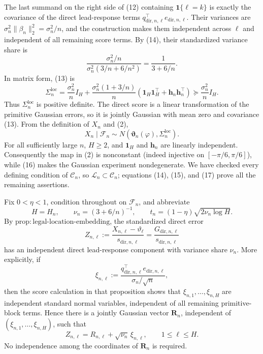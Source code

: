 The last summand on the right side of (12) containing
\(\boldsymbol 1\{\ell=k\}\) is exactly the covariance of the direct
lead-response terms
\(q_{\mathrm{dir},n,\ell}^{\top}e_{\mathrm{dir},n,\ell}\).  Their variances
are \(\sigma_n^2\|\beta_n\|_2^2=\sigma_n^2/n\), and the construction makes
them independent across \(\ell\) and independent of all remaining score
terms.  By (14), their standardized variance share is
\[
 \frac{\sigma_n^2/n}
      {\sigma_n^2(3/n+6/n^2)}=\frac1{3+6/n}.                 \tag{15}
\]
In matrix form, (13) is
\[
 \Sigma_n^{\mathrm{loc}}
 =\frac{\sigma_n^2}{n}I_H
  +\frac{\sigma_n^2(1+3/n)}{n}
    (\boldsymbol 1_H\boldsymbol 1_H^{\top}
      +\boldsymbol h_n\boldsymbol h_n^{\top})
 \succeq \frac{\sigma_n^2}{n}I_H.                           \tag{16}
\]
Thus \(\Sigma_n^{\mathrm{loc}}\) is positive definite.  The direct score is
a linear transformation of the primitive Gaussian errors, so it is jointly
Gaussian with mean zero and covariance (13).  From the definition of \(X_n\)
and (2),
\[
 X_n\mid\mathcal F_n
 \sim N(\boldsymbol\vartheta_n(\varphi),\Sigma_n^{\mathrm{loc}}). \tag{17}
\]
For all sufficiently large \(n\), \(H\geq2\), and
\(\boldsymbol 1_H\) and \(\boldsymbol h_n\) are linearly independent.
Consequently the map in (2) is nonconstant (indeed injective on
\([-\pi/6,\pi/6]\)), while (16) makes the Gaussian experiment nondegenerate.
We have checked every defining condition of \(\mathcal C_n\), so
\(\mathcal L_n\subset\mathcal C_n\); equations (14), (15), and (17) prove all
the remaining assertions.

Fix \(0<\eta<1\), condition throughout on \(\mathcal F_n\), and abbreviate
\[
 H=H_n,\qquad
 \nu_n=(3+6/n)^{-1},\qquad
 t_n=(1-\eta)\sqrt{2\nu_n\log H}.
\]
By \(\mathrm{prop{:}legal\mbox{-}location\mbox{-}embedding}\), the standardized
direct error
\[
 Z_{n,\ell}
 :=\frac{X_{n,\ell}-\vartheta_\ell}{s_{\mathrm{dir},n,\ell}}
 =\frac{G_{\mathrm{dir},n,\ell}}{s_{\mathrm{dir},n,\ell}}
\]
has an independent direct lead-response component with variance share
\(\nu_n\).  More explicitly, if
\[
 \xi_{n,\ell}
 :=\frac{q_{\mathrm{dir},n,\ell}^{\top}
              e_{\mathrm{dir},n,\ell}}{\sigma_n/\sqrt n},
\]
then the score calculation in that proposition shows that
\(\xi_{n,1},\ldots,\xi_{n,H}\) are independent standard normal variables,
independent of all remaining primitive-block terms.  Hence there is a jointly
Gaussian vector \(\boldsymbol R_n\), independent of
\((\xi_{n,1},\ldots,\xi_{n,H})\), such that
\[
 Z_{n,\ell}=R_{n,\ell}+\sqrt{\nu_n}\,\xi_{n,\ell},
 \qquad 1\leq\ell\leq H.                                    \tag{18}
\]
No independence among the coordinates of \(\boldsymbol R_n\) is required.

